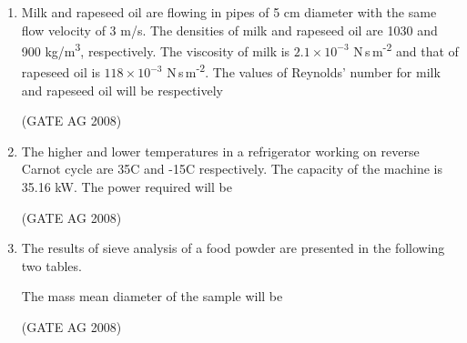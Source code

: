 \documentclass[journal,12pt,onecolumn]{IEEEtran}
\begin{document}
\begin{enumerate}
\medskip

\item 
 Milk and rapeseed oil are flowing in pipes of 5 cm diameter with the same flow velocity of 3 m/s. The densities of milk and rapeseed oil are 1030 and 900 kg/m\textsuperscript{3}, respectively. The viscosity of milk is $2.1 \times 10^{-3}$ N\,s\,m\textsuperscript{-2} and that of rapeseed oil is $118 \times 10^{-3}$ N\,s\,m\textsuperscript{-2}. The values of Reynolds' number for milk and rapeseed oil will be respectively
\begin{enumerate}
\end{enumerate}
\hfill(GATE AG 2008)\\

\medskip

\item 
 The higher and lower temperatures in a refrigerator working on reverse Carnot cycle are 35\textdegree C and -15\textdegree C respectively. The capacity of the machine is 35.16 kW. The power required will be
\begin{enumerate}
\end{enumerate}
\hfill(GATE AG 2008)\\

\medskip

\item 
 The results of sieve analysis of a food powder are presented in the following two tables.


\medskip



The mass mean diameter of the sample will be
\begin{enumerate}
\end{enumerate}
\hfill(GATE AG 2008)\\


\end{enumerate}
\end{document}
